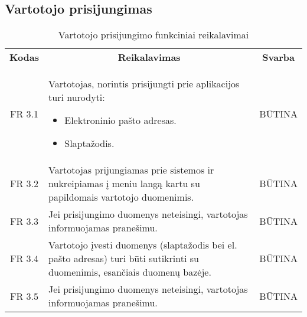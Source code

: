 \documentclass{VUMIFPSkursinis}
\begin{document}
\pagebreak

\subsection{Vartotojo prisijungimas}

\begin{center}
	\begin{table}[H]
	\begin{tabular}{|p{2cm}|p{}|p{}|}
	\hline
	    \rowcolor{lightgray}
		\multicolumn{3}{|c|}{Vartotojo prisijungimas}\\
		
	\hline
		\multicolumn{1}{|c|}{{\bfseries Kodas}}&
		\multicolumn{1}{|c|}{{\bfseries Reikalavimas}}&
		\multicolumn{1}{|c|}{{\bfseries Svarba}}\\

	\hline
	
		\multicolumn{1}{|c|}{FR 3.1}&
		{Vartotojas, norintis prisijungti prie aplikacijos turi nurodyti:
			\begin{itemize}
				\item Elektroninio pašto adresas.
				\item Slaptažodis.
			\end{itemize}
		}&
		\multicolumn{1}{|c|}{BŪTINA}\\	
		
	\hline	
		\multicolumn{1}{|c|}{FR 3.2}&
		{Vartotojas prijungiamas prie sistemos ir nukreipiamas į meniu langą kartu su papildomais vartotojo duomenimis.}&
		\multicolumn{1}{|c|}{BŪTINA}\\
		
	\hline	
		\multicolumn{1}{|c|}{FR 3.3}&
		{Jei prisijungimo duomenys neteisingi, vartotojas informuojamas pranešimu.}&
		\multicolumn{1}{|c|}{BŪTINA}\\		
		
	\hline
		\multicolumn{1}{|c|}{FR 3.4}&
		{Vartotojo įvesti duomenys (slaptažodis bei el. pašto adresas) turi būti sutikrinti su duomenimis, esančiais duomenų bazėje.}&
		\multicolumn{1}{|c|}{BŪTINA}\\
		
	\hline	
		\multicolumn{1}{|c|}{FR 3.5}&
		{Jei prisijungimo duomenys neteisingi, vartotojas informuojamas pranešimu.}&
		\multicolumn{1}{|c|}{BŪTINA}\\
	\hline
	
	
	
	\end{tabular}	
	\caption{Vartotojo prisijungimo funkciniai reikalavimai}
	\label{table:VartotojoPrisijungimas}		
	\end{table}

\end{center}
\pagebreak
\end{document}
